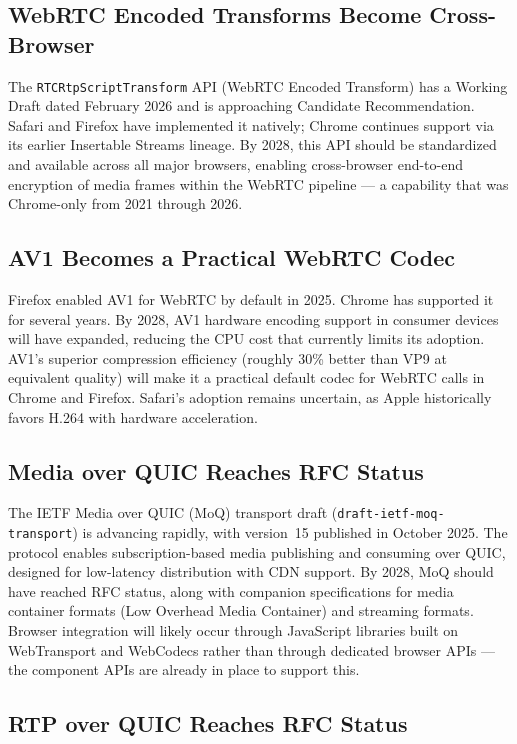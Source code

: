 \documentclass[11pt]{article}
\begin{document}
\subsection{WebRTC Encoded Transforms Become Cross-Browser}

The \texttt{RTCRtpScriptTransform} API (WebRTC Encoded Transform) has a
Working Draft dated February 2026 and is approaching Candidate
Recommendation. Safari and Firefox have implemented it natively; Chrome
continues support via its earlier Insertable Streams lineage. By 2028, this
API should be standardized and available across all major browsers, enabling
cross-browser end-to-end encryption of media frames within the WebRTC
pipeline --- a capability that was Chrome-only from 2021 through 2026.

\subsection{AV1 Becomes a Practical WebRTC Codec}

Firefox enabled AV1 for WebRTC by default in 2025. Chrome has supported it
for several years. By 2028, AV1 hardware encoding support in consumer devices
will have expanded, reducing the CPU cost that currently limits its adoption.
AV1's superior compression efficiency (roughly 30\% better than VP9 at
equivalent quality) will make it a practical default codec for WebRTC calls
in Chrome and Firefox. Safari's adoption remains uncertain, as Apple
historically favors H.264 with hardware acceleration.

\subsection{Media over QUIC Reaches RFC Status}

The IETF Media over QUIC (MoQ) transport draft
(\texttt{draft-ietf-moq-transport}) is advancing rapidly, with version~15
published in October 2025. The protocol enables subscription-based media
publishing and consuming over QUIC, designed for low-latency distribution
with CDN support. By 2028, MoQ should have reached RFC status, along with
companion specifications for media container formats (Low Overhead Media
Container) and streaming formats. Browser integration will likely occur
through JavaScript libraries built on WebTransport and WebCodecs rather than
through dedicated browser APIs --- the component APIs are already in place to
support this.

\subsection{RTP over QUIC Reaches RFC Status}
\end{document}
